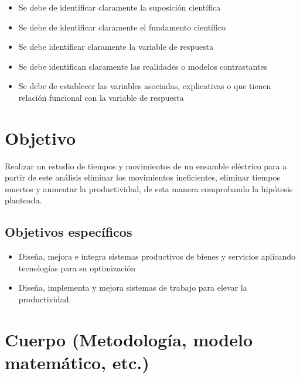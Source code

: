             \begin{itemize}
                \item Se debe de identificar claramente la suposición científica
                \item Se debe de identificar claramente el fundamento científico
                \item Se debe identificar claramente la variable de respuesta
                \item Se debe identifican claramente las realidades o modelos contrastantes
                \item Se debe de establecer las variables asociadas, explicativas o que tienen relación funcional con la variable de respuesta
            \end{itemize}
            \section{Objetivo}
            
            Realizar un estudio de tiempos y movimientos de un ensamble eléctrico para a partir de este análisis eliminar los movimientos ineficientes, eliminar tiempos muertos y aumentar la productividad, de esta manera comprobando la hipótesis planteada.
            
            
            \subsection{Objetivos específicos }
            
            \begin{itemize}
                \item Diseña, mejora e integra sistemas productivos de bienes y servicios aplicando tecnologías para su optimización
                \item Diseña, implementa y mejora sistemas de trabajo para elevar la productividad.
            \end{itemize}
            
            
            \section{Cuerpo (Metodología, modelo matemático, etc.)}
            
            
            
            
